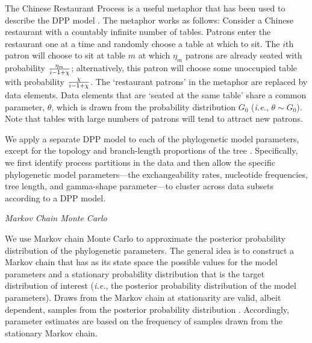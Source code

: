 \documentclass[11pt]{article}
\begin{document}
The Chinese Restaurant Process is a useful metaphor that has been used to describe the DPP model \citep{aldous85}.
The metaphor works as follows: Consider a Chinese restaurant with a countably infinite number of tables.
Patrons enter the restaurant one at a time and randomly choose a table at which to sit.
The $i$th patron will choose to sit at table $m$ at which $\eta_m$ patrons are already seated with probability ${\eta_m \over i-1+ \chi}$; alternatively, this patron will choose some unoccupied table with probability ${\chi \over i-1+ \chi}$.
The `restaurant patrons' in the metaphor are replaced by data elements.
Data elements that are `seated at the same table' share a common parameter, $\theta$, which is drawn from the probability distribution $G_0$ ({\it i.e.}, $\theta \sim G_0$).
Note that tables with large numbers of patrons will tend to attract new patrons.


We apply a separate DPP model to each of the phylogenetic model parameters, except for the topology and branch-length proportions of the tree \citep[however, see][]{ane07}.
Specifically, we first identify process partitions in the data and then allow the specific phylogenetic model parameters---the exchangeability rates, nucleotide frequencies, tree length, and gamma-shape parameter---to cluster across data subsets according to a DPP model.

\bigskip

\begin{center}
{\it Markov Chain Monte Carlo}
\end{center}

We use Markov chain Monte Carlo \citep[MCMC;][]{metropolis53,hastings70} to approximate the posterior probability distribution of the phylogenetic parameters.
The general idea is to construct a Markov chain that has as its state space the possible values for the model parameters and a stationary probability distribution that is the target distribution of interest ({\it i.e.}, the posterior probability distribution of the model parameters).
Draws from the Markov chain at stationarity are valid, albeit dependent, samples from the posterior probability distribution \citep{tierney94}.
Accordingly, parameter estimates are based on the frequency of samples drawn from the stationary Markov chain.
\end{document}
